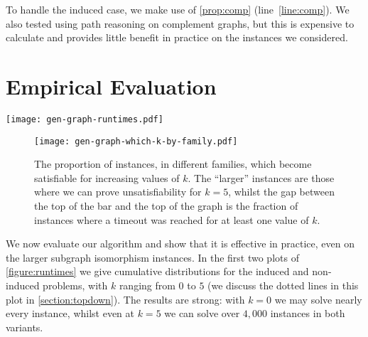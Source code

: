 \documentclass[letterpaper]{article}
\theoremstyle{definition}
\begin{document}
To handle the induced case, we make use of \cref{prop:comp} (line~\ref{line:comp}). We also tested
using path reasoning on complement graphs, but this is expensive to calculate and provides little
benefit in practice on the instances we considered.

\section{Empirical Evaluation}\label{section:evaluation}

\begin{figure*}[tb]
    \centering
    \texttt{[image: gen-graph-runtimes.pdf]}
    \caption{In the first two plots we show the cumulative number of instances solved over time, for the
        induced and non-induced problems, with different values of $k$. We also show the results of
        iteratively increasing $k$ until a solution is found, and in the induced case, the
        performance of two leading maximum common subgraph algorithms. In the third plot we show results
        comparing iteratively increasing $k$ with our algorithm to other approaches on maximum
        common induced subgraph instances.}\label{figure:runtimes}
\end{figure*}

\begin{figure}[h!]
    \centering
    \texttt{[image: gen-graph-which-k-by-family.pdf]}
    \caption{The proportion of instances, in different families, which become satisfiable for
    increasing values of $k$. The ``larger'' instances are those where we can prove unsatisfiability for
    $k = 5$, whilst the gap between the top of the bar and the top of the graph is the fraction of
    instances where a timeout was reached for at least one value of $k$.}\label{figure:which-k}
\end{figure}

We now evaluate our algorithm and show that it is effective in practice, even on the larger subgraph
isomorphism instances. In the first two plots of \cref{figure:runtimes} we give cumulative
distributions for the induced and non-induced problems, with $k$ ranging from $0$ to $5$ (we discuss
the dotted lines in this plot in \cref{section:topdown}). The results are strong: with $k = 0$ we
may solve nearly every instance, whilst even at $k = 5$ we can solve over $4,000$ instances in both
variants.
\end{document}
